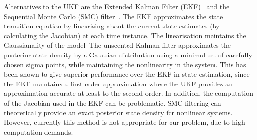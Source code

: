\documentclass[twocolumn,11pt,a4paper]{article}		%
\begin{document}
Alternatives to the UKF are the Extended Kalman Filter (EKF)~\cite{Haykin2001} and the Sequential Monte Carlo (SMC) filter~\cite{doucet2001}. The EKF approximates the state transition equation by linearising about the current state estimates (by calculating the Jacobian) at each time instance. The linearisation maintains the Gaussianality of the model. The unscented Kalman filter approximates the posterior state density by a Gaussian distribution using a minimal set of carefully chosen sigma points, while maintaining the nonlinearity in the system. This has been shown to give superior performance over the EKF in state estimation, since the EKF maintains a first order approximation where the UKF provides an approximation accurate at least to the second order. In addition, the computation of the Jacobian used in the EKF can be problematic. SMC filtering can theoretically provide an exact posterior state density for nonlinear systems. However, currently this method is not appropriate for our problem, due to high computation demands. 

\end{document}
